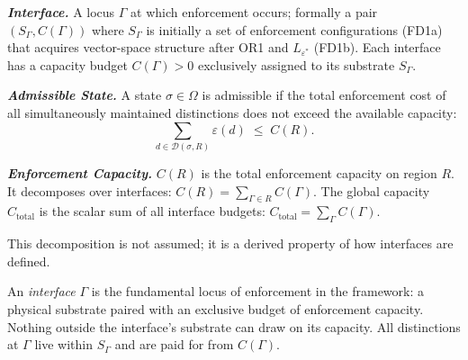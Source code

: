 \documentclass[11pt]{article}
\theoremstyle{remark}
\begin{document}
\medskip
\textbf{\textit{Interface.}} A locus $\Gamma$ at which enforcement occurs; formally a pair $(S_\Gamma, C(\Gamma))$ where $S_\Gamma$ is initially a set of enforcement configurations (FD1a) that acquires vector-space structure after OR1 and $L_{\varepsilon^*}$ (FD1b).  Each interface has a capacity budget $C(\Gamma) > 0$ exclusively assigned to its substrate $S_\Gamma$.

\medskip
\textbf{\textit{Admissible State.}} A state $\sigma \in \Omega$ is admissible if the total enforcement cost of all simultaneously maintained distinctions does not exceed the available capacity:
\[
\sum_{d \in \mathcal{D}(\sigma, R)} \varepsilon(d) \;\le\; C(R).
\]

\medskip
\textbf{\textit{Enforcement Capacity.}} $C(R)$ is the total enforcement capacity on region $R$.  It decomposes over interfaces: $C(R) = \sum_{\Gamma \in R} C(\Gamma)$.  The global capacity $C_{\mathrm{total}}$ is the scalar sum of all interface budgets: $C_{\mathrm{total}} = \sum_\Gamma C(\Gamma)$.

This decomposition is not assumed; it is a derived property of how interfaces are defined.


An \emph{interface} $\Gamma$ is the fundamental locus of enforcement in the framework: a physical substrate paired with an exclusive budget of enforcement capacity.  Nothing outside the interface's substrate can draw on its capacity.  All distinctions at $\Gamma$ live within $S_\Gamma$ and are paid for from $C(\Gamma)$.
\end{document}

